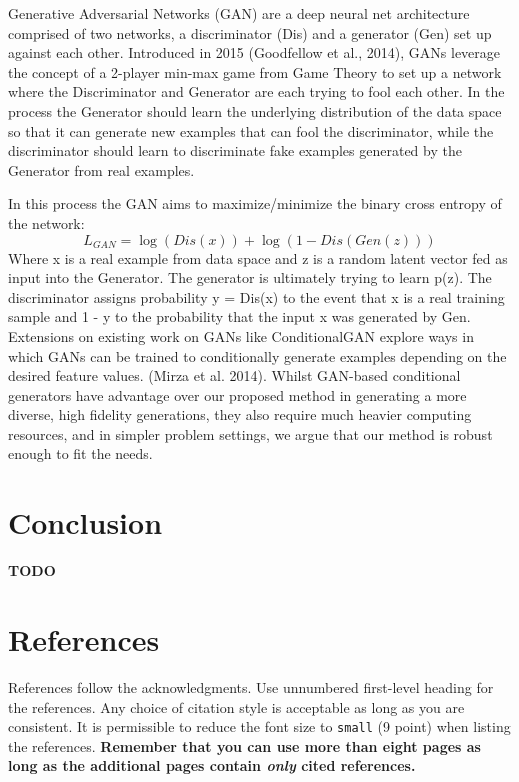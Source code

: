 \documentclass{article}
\begin{document}
Generative Adversarial Networks (GAN) are a deep neural net architecture comprised of two networks, a discriminator (Dis) and a generator (Gen) set up against each other. Introduced in 2015 (Goodfellow et al., 2014), GANs leverage the concept of a 2-player min-max game from Game Theory to set up a network where the Discriminator and Generator are each trying to fool each other. In the process the Generator should learn the underlying distribution of the data space so that it can generate new examples that can fool the discriminator, while the discriminator should learn to discriminate fake examples generated by the Generator from real examples.\par
In this process the GAN aims to maximize/minimize the binary cross entropy of the network:
\begin{equation} 
L_{GAN}=\log(Dis(x))+\log(1-Dis(Gen(z)))
\end{equation}
Where x is a real example from data space and z is a random latent vector fed as input into the Generator. The generator is ultimately trying to learn p(z). The discriminator assigns probability y = Dis(x)  to the event that x is a real training sample and 1 - y to the probability that the input x was generated by Gen. Extensions on existing work on GANs like ConditionalGAN explore ways in which GANs can be trained to conditionally generate examples depending on the desired feature values. (Mirza et al. 2014). Whilst GAN-based conditional generators have advantage over our proposed method in generating a more diverse, high fidelity generations, they also require much heavier computing resources, and in simpler problem settings, we argue that our method is robust enough to fit the needs.

\section{Conclusion}

\textbf{TODO}

\section*{References}

References follow the acknowledgments. Use unnumbered first-level
heading for the references. Any choice of citation style is acceptable
as long as you are consistent. It is permissible to reduce the font
size to \verb+small+ (9 point) when listing the references. {\bf
  Remember that you can use more than eight pages as long as the
  additional pages contain \emph{only} cited references.}
\medskip
\end{document}
